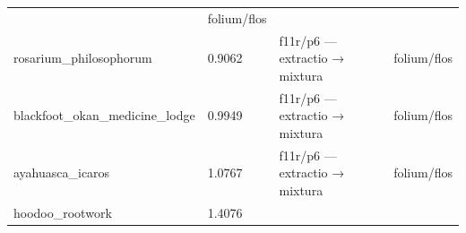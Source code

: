\documentclass[12pt,a4paper]{article}
\begin{document}
\begin{longtable}[]{@{}llll@{}}
\begin{minipage}[t]{0.22\columnwidth}
\end{minipage} & \begin{minipage}[t]{0.22\columnwidth}\raggedright
folium/flos\strut
\end{minipage}\tabularnewline
\begin{minipage}[t]{0.22\columnwidth}\raggedright
rosarium\_philosophorum\strut
\end{minipage} & \begin{minipage}[t]{0.22\columnwidth}\raggedright
0.9062\strut
\end{minipage} & \begin{minipage}[t]{0.22\columnwidth}\raggedright
f11r/p6 --- extractio → mixtura\strut
\end{minipage} & \begin{minipage}[t]{0.22\columnwidth}\raggedright
folium/flos\strut
\end{minipage}\tabularnewline
\begin{minipage}[t]{0.22\columnwidth}\raggedright
blackfoot\_okan\_medicine\_lodge\strut
\end{minipage} & \begin{minipage}[t]{0.22\columnwidth}\raggedright
0.9949\strut
\end{minipage} & \begin{minipage}[t]{0.22\columnwidth}\raggedright
f11r/p6 --- extractio → mixtura\strut
\end{minipage} & \begin{minipage}[t]{0.22\columnwidth}\raggedright
folium/flos\strut
\end{minipage}\tabularnewline
\begin{minipage}[t]{0.22\columnwidth}\raggedright
ayahuasca\_icaros\strut
\end{minipage} & \begin{minipage}[t]{0.22\columnwidth}\raggedright
1.0767\strut
\end{minipage} & \begin{minipage}[t]{0.22\columnwidth}\raggedright
f11r/p6 --- extractio → mixtura\strut
\end{minipage} & \begin{minipage}[t]{0.22\columnwidth}\raggedright
folium/flos\strut
\end{minipage}\tabularnewline
\begin{minipage}[t]{0.22\columnwidth}\raggedright
hoodoo\_rootwork\strut
\end{minipage} & \begin{minipage}[t]{0.22\columnwidth}\raggedright
1.4076\strut

\end{minipage}
\end{longtable}
\end{document}
